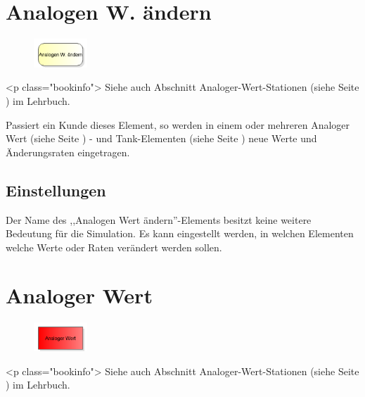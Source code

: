 \section{Analogen W. ändern}
\label{ref:ModelElementAnalogAssign}

\begin{figure}
\vspace{-22pt}
\includegraphics[width=2cm]{imageModelElementAnalogAssign.png}
\vspace{-22pt}
\end{figure}

<p class="bookinfo">
Siehe auch Abschnitt Analoger-Wert-Stationen (siehe Seite \pageref{ref:book:8.8.1}) im Lehrbuch.

Passiert ein Kunde dieses Element, so werden in einem oder mehreren
Analoger Wert (siehe Seite \pageref{ref:ModelElementAnalogValue}) - und
Tank-Elementen (siehe Seite \pageref{ref:ModelElementTank}) 
neue Werte und Änderungsraten eingetragen.

\subsection*{Einstellungen}

Der Name des ,,Analogen Wert ändern''-Elements besitzt keine weitere Bedeutung für die Simulation.
Es kann eingestellt werden, in welchen Elementen welche Werte oder Raten verändert werden sollen.


\section{Analoger Wert}
\label{ref:ModelElementAnalogValue}

\begin{figure}
\vspace{-22pt}
\includegraphics[width=2cm]{imageModelElementAnalogValue.png}
\vspace{-22pt}
\end{figure}

<p class="bookinfo">
Siehe auch Abschnitt Analoger-Wert-Stationen (siehe Seite \pageref{ref:book:8.8.1}) im Lehrbuch.

